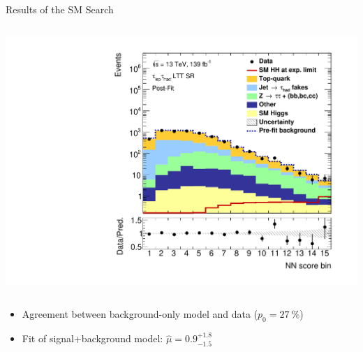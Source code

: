 \documentclass[11pt, xcolor={dvipsnames}, aspectratio=169, notes]{beamer}
\begin{document}
\begin{frame}{Results of the SM \allbold{\HH} Search}
\begin{columns}
    \centering


    \includegraphics[width=\textwidth, trim=0.5em 0 2.5em 0, clip]{results_nonres/postfit/Region_BMin0_incJet1_distNN_J2_DSM_T2_SpcTauLH_Y2015_LTT1_L1_GlobalFit_conditionnal_mu0log}
  \end{columns}

  \vspace*{0.5em}

  \begin{itemize}
    \setlength{\itemsep}{0.75em}

  \item Agreement between background-only model and data
    ($p_0 = \SI{27}{\percent}$)

  \item Fit of signal+background model: $\hat{\mu} = 0.9^{+1.8}_{-1.5}$

  \end{itemize}
\end{frame}

\end{document}

